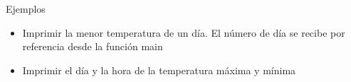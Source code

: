 \documentclass[xcolor=pdftex,table,11pt]{beamer}
\begin{document}
\begin{frame}[allowframebreaks]{Ejemplos}
\begin{enumerate}
\begin{itemize}
          \item Imprimir la menor temperatura de un día. El número de día se recibe por referencia desde la función main
          
          \item Imprimir el día y la hora de la temperatura máxima y mínima

     
      \end{itemize}
\href{https://github.com/danis963/informaticaI_IUA/blob/main/c/src/7-funcion_triangulo.c}{}


\end{enumerate}

\end{frame}
\end{document}

